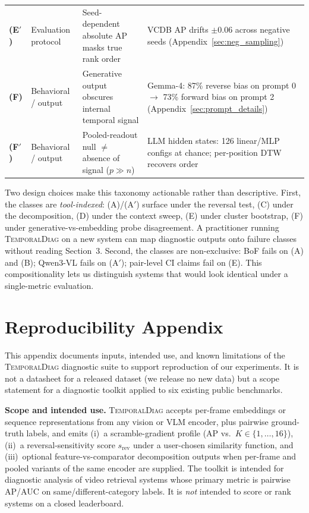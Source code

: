 \documentclass{article}
\theoremstyle{remark}
\begin{document}
\begin{table}[h]
\begin{tabular}{llp{4.4cm}p{4.6cm}}
\textbf{(E$'$)} & Evaluation protocol & Seed-dependent absolute AP masks true rank order & VCDB AP drifts ${\pm}0.06$ across negative seeds (Appendix~\ref{sec:neg_sampling}) \\
\textbf{(F)} & Behavioral / output & Generative output obscures internal temporal signal & Gemma-4: 87\% reverse bias on prompt 0 $\to$ 73\% forward bias on prompt 2 (Appendix~\ref{sec:prompt_details}) \\
\textbf{(F$'$)} & Behavioral / output & Pooled-readout null $\ne$ absence of signal ($p\!\gg\!n$) & LLM hidden states: 126 linear/MLP configs at chance; per-position DTW recovers order \\
\bottomrule
\end{tabular}
\end{table}

Two design choices make this taxonomy actionable rather than descriptive. First, the classes are \emph{tool-indexed}: (A)/(A$'$) surface under the reversal test, (C) under the decomposition, (D) under the context sweep, (E) under cluster bootstrap, (F) under generative-vs-embedding probe disagreement. A practitioner running \textsc{TemporalDiag} on a new system can map diagnostic outputs onto failure classes without reading Section~3. Second, the classes are non-exclusive: BoF fails on (A) and (B); Qwen3-VL fails on (A$'$); pair-level CI claims fail on (E). This compositionality lets us distinguish systems that would look identical under a single-metric evaluation.

\section{Reproducibility Appendix}
\label{sec:reproducibility}

This appendix documents inputs, intended use, and known limitations of the \textsc{TemporalDiag} diagnostic suite to support reproduction of our experiments. It is not a datasheet for a released dataset (we release no new data) but a scope statement for a diagnostic toolkit applied to six existing public benchmarks.

\textbf{Scope and intended use.} \textsc{TemporalDiag} accepts per-frame embeddings or sequence representations from any vision or VLM encoder, plus pairwise ground-truth labels, and emits (i)~a scramble-gradient profile (AP vs.\ $K\in\{1,\ldots,16\}$), (ii)~a reversal-sensitivity score $s_\text{rev}$ under a user-chosen similarity function, and (iii)~optional feature-vs-comparator decomposition outputs when per-frame and pooled variants of the same encoder are supplied. The toolkit is intended for diagnostic analysis of video retrieval systems whose primary metric is pairwise AP/AUC on same/different-category labels. It is \emph{not} intended to score or rank systems on a closed leaderboard.
\end{document}
